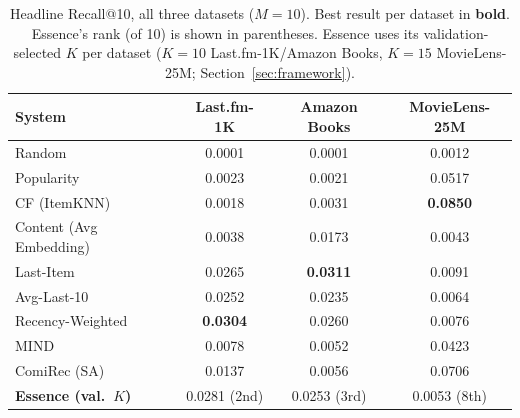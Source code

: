 \documentclass[11pt,a4paper]{article}
\begin{document}
\begin{table}[H]
\centering
\caption{Headline Recall@10, all three datasets ($M=10$). Best result per
         dataset in \textbf{bold}. Essence's rank (of 10) is shown in
         parentheses. Essence uses its validation-selected $K$ per dataset
         ($K=10$ Last.fm-1K/Amazon Books, $K=15$ MovieLens-25M;
         Section~\ref{sec:framework}).}
\label{tab:headline-recall}
\begin{tabular}{lccc}
\toprule
\textbf{System} & \textbf{Last.fm-1K} & \textbf{Amazon Books} & \textbf{MovieLens-25M} \\
\midrule
Random                   & 0.0001 & 0.0001 & 0.0012 \\
Popularity               & 0.0023 & 0.0021 & 0.0517 \\
CF (ItemKNN)             & 0.0018 & 0.0031 & \textbf{0.0850} \\
Content (Avg Embedding)  & 0.0038 & 0.0173 & 0.0043 \\
Last-Item                & 0.0265 & \textbf{0.0311} & 0.0091 \\
Avg-Last-10              & 0.0252 & 0.0235 & 0.0064 \\
Recency-Weighted         & \textbf{0.0304} & 0.0260 & 0.0076 \\
MIND                     & 0.0078 & 0.0052 & 0.0423 \\
ComiRec (SA)             & 0.0137 & 0.0056 & 0.0706 \\
\textbf{Essence (val.\ $K$)} & 0.0281 (2nd) & 0.0253 (3rd) & 0.0053 (8th) \\
\bottomrule
\end{tabular}
\end{table}
\end{document}
